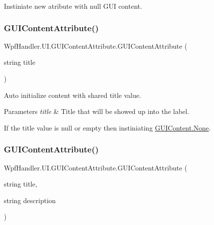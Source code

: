 Instiniate new atribute with null G\+UI content. 

\mbox{\label{class_wpf_handler_1_1_u_i_1_1_g_u_i_content_attribute_a26546834215fbd36a79b7811ddc0adfe}} 
\subsubsection{\texorpdfstring{G\+U\+I\+Content\+Attribute()}{GUIContentAttribute()}\hspace{0.1cm}{\footnotesize\ttfamily [2/5]}}
{\footnotesize\ttfamily Wpf\+Handler.\+U\+I.\+G\+U\+I\+Content\+Attribute.\+G\+U\+I\+Content\+Attribute (\begin{DoxyParamCaption}\item[{string}]{title }\end{DoxyParamCaption})}



Auto initialize content with shared title value. 


\begin{DoxyParams}{Parameters}
{\em title} & Title that will be showed up into the label.\\
\hline
\end{DoxyParams}


If the title value is null or empty then instiniating \mbox{\hyperlink{class_wpf_handler_1_1_u_i_1_1_g_u_i_content_a9d8259c5a572b9ab33faab8166fc6053}{G\+U\+I\+Content.\+None}}.\mbox{\label{class_wpf_handler_1_1_u_i_1_1_g_u_i_content_attribute_ad64c2fed8f65549ff65ba1bfa3185e05}} 
\subsubsection{\texorpdfstring{G\+U\+I\+Content\+Attribute()}{GUIContentAttribute()}\hspace{0.1cm}{\footnotesize\ttfamily [3/5]}}
{\footnotesize\ttfamily Wpf\+Handler.\+U\+I.\+G\+U\+I\+Content\+Attribute.\+G\+U\+I\+Content\+Attribute (\begin{DoxyParamCaption}\item[{string}]{title,  }\item[{string}]{description }\end{DoxyParamCaption})}



